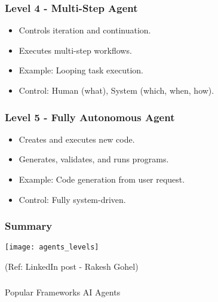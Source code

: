 \begin{frame}[fragile]\frametitle{Level 4 - Multi-Step Agent}
      \begin{itemize}
      \item Controls iteration and continuation.
      \item Executes multi-step workflows.
      \item Example: Looping task execution.
      \item Control: Human (what), System (which, when, how).
      \end{itemize}
\end{frame}

\begin{frame}[fragile]\frametitle{Level 5 - Fully Autonomous Agent}
      \begin{itemize}
      \item Creates and executes new code.
      \item Generates, validates, and runs programs.
      \item Example: Code generation from user request.
      \item Control: Fully system-driven.
      \end{itemize}
\end{frame}

\begin{frame}[fragile]\frametitle{Summary}

\begin{center}
\texttt{[image: agents\_levels]}
\end{center}	  

{\tiny (Ref: LinkedIn post - Rakesh Gohel)}

\end{frame}

\begin{frame}[fragile]\frametitle{}
\begin{center}
{\Large Popular Frameworks AI Agents}

\end{center}
\end{frame}


